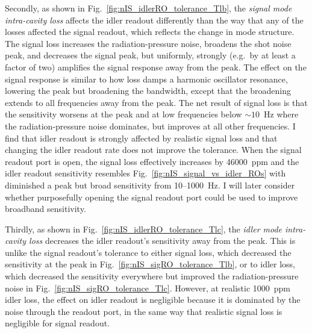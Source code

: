 Secondly, as shown in Fig.~\ref{fig:nIS_idlerRO_tolerance_Tlb}, the \emph{signal mode intra-cavity loss} affects the idler readout differently than the way that any of the losses affected the signal readout, which reflects the change in mode structure. The signal loss increases the radiation-pressure noise, broadens the shot noise peak, and decreases the signal peak, but uniformly, strongly (e.g.\ by at least a factor of two) amplifies the signal response away from the peak. The effect on the signal response is similar to how loss damps a harmonic oscillator resonance, lowering the peak but broadening the bandwidth, except that the broadening extends to all frequencies away from the peak. The net result of signal loss is that the sensitivity worsens at the peak and at low frequencies below $\sim10$~Hz where the radiation-pressure noise dominates, but improves at all other frequencies. I find that idler readout is strongly affected by realistic signal loss and that changing the idler readout rate does not improve the tolerance. When the signal readout port is open, the signal loss effectively increases by 46000~ppm and the idler readout sensitivity resembles Fig.~\ref{fig:nIS_signal_vs_idler_ROs} with diminished a peak but broad sensitivity from 10--1000~Hz. I will later consider whether purposefully opening the signal readout port could be used to improve broadband sensitivity.  %

Thirdly, as shown in Fig.~\ref{fig:nIS_idlerRO_tolerance_Tlc}, the \emph{idler mode intra-cavity loss} decreases the idler readout's sensitivity away from the peak. This is unlike the signal readout's tolerance to either signal loss, which decreased the sensitivity at the peak in Fig.~\ref{fig:nIS_sigRO_tolerance_Tlb}, or to idler loss, which decreased the sensitivity everywhere but improved the radiation-pressure noise in Fig.~\ref{fig:nIS_sigRO_tolerance_Tlc}. %
However, at realistic 1000~ppm idler loss, the effect on idler readout is negligible because it is dominated by the noise through the readout port, in the same way that realistic signal loss is negligible for signal readout.


